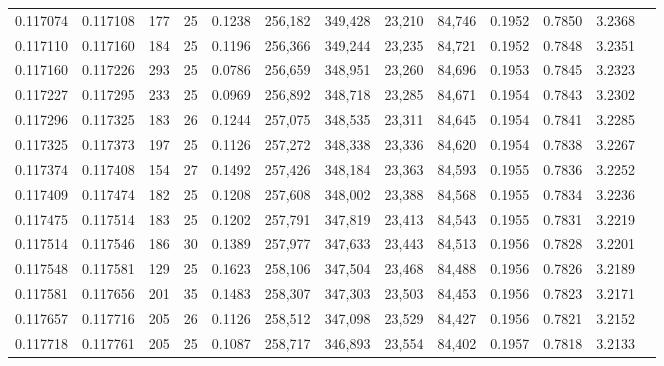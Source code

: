 \begin{tabular}{rrrrrrrrrrrrr}
0.117074 & 0.117108 & 177 &  25 &                                     0.1238 & 256,182 & 349,428 &  23,210 &  84,746 & 0.1952 & 0.7850 & 3.2368 \\
0.117110 & 0.117160 & 184 &  25 &                                     0.1196 & 256,366 & 349,244 &  23,235 &  84,721 & 0.1952 & 0.7848 & 3.2351 \\
0.117160 & 0.117226 & 293 &  25 &                                     0.0786 & 256,659 & 348,951 &  23,260 &  84,696 & 0.1953 & 0.7845 & 3.2323 \\
0.117227 & 0.117295 & 233 &  25 &                                     0.0969 & 256,892 & 348,718 &  23,285 &  84,671 & 0.1954 & 0.7843 & 3.2302 \\
0.117296 & 0.117325 & 183 &  26 &                                     0.1244 & 257,075 & 348,535 &  23,311 &  84,645 & 0.1954 & 0.7841 & 3.2285 \\
0.117325 & 0.117373 & 197 &  25 &                                     0.1126 & 257,272 & 348,338 &  23,336 &  84,620 & 0.1954 & 0.7838 & 3.2267 \\
0.117374 & 0.117408 & 154 &  27 &                                     0.1492 & 257,426 & 348,184 &  23,363 &  84,593 & 0.1955 & 0.7836 & 3.2252 \\
0.117409 & 0.117474 & 182 &  25 &                                     0.1208 & 257,608 & 348,002 &  23,388 &  84,568 & 0.1955 & 0.7834 & 3.2236 \\
0.117475 & 0.117514 & 183 &  25 &                                     0.1202 & 257,791 & 347,819 &  23,413 &  84,543 & 0.1955 & 0.7831 & 3.2219 \\
0.117514 & 0.117546 & 186 &  30 &                                     0.1389 & 257,977 & 347,633 &  23,443 &  84,513 & 0.1956 & 0.7828 & 3.2201 \\
0.117548 & 0.117581 & 129 &  25 &                                     0.1623 & 258,106 & 347,504 &  23,468 &  84,488 & 0.1956 & 0.7826 & 3.2189 \\
0.117581 & 0.117656 & 201 &  35 &                                     0.1483 & 258,307 & 347,303 &  23,503 &  84,453 & 0.1956 & 0.7823 & 3.2171 \\
0.117657 & 0.117716 & 205 &  26 &                                     0.1126 & 258,512 & 347,098 &  23,529 &  84,427 & 0.1956 & 0.7821 & 3.2152 \\
0.117718 & 0.117761 & 205 &  25 &                                     0.1087 & 258,717 & 346,893 &  23,554 &  84,402 & 0.1957 & 0.7818 & 3.2133 \\

\end{tabular}

